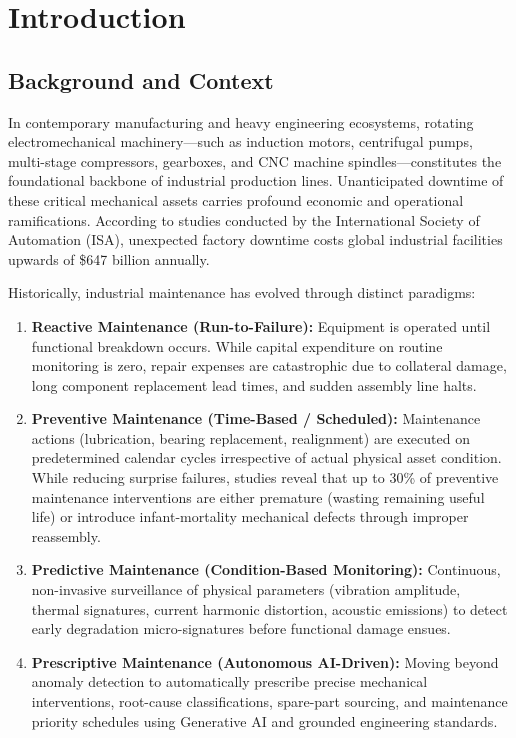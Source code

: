 \documentclass[12pt,a4paper,oneside]{report}
\begin{document}
\chapter{Introduction}

\section{Background and Context}
In contemporary manufacturing and heavy engineering ecosystems, rotating electromechanical machinery—such as induction motors, centrifugal pumps, multi-stage compressors, gearboxes, and CNC machine spindles—constitutes the foundational backbone of industrial production lines. Unanticipated downtime of these critical mechanical assets carries profound economic and operational ramifications. According to studies conducted by the International Society of Automation (ISA), unexpected factory downtime costs global industrial facilities upwards of \$647 billion annually. 

Historically, industrial maintenance has evolved through distinct paradigms:
\begin{enumerate}[label=\textbf{\arabic*.}]
    \item \textbf{Reactive Maintenance (Run-to-Failure):} Equipment is operated until functional breakdown occurs. While capital expenditure on routine monitoring is zero, repair expenses are catastrophic due to collateral damage, long component replacement lead times, and sudden assembly line halts.
    \item \textbf{Preventive Maintenance (Time-Based / Scheduled):} Maintenance actions (lubrication, bearing replacement, realignment) are executed on predetermined calendar cycles irrespective of actual physical asset condition. While reducing surprise failures, studies reveal that up to 30\% of preventive maintenance interventions are either premature (wasting remaining useful life) or introduce infant-mortality mechanical defects through improper reassembly.
    \item \textbf{Predictive Maintenance (Condition-Based Monitoring):} Continuous, non-invasive surveillance of physical parameters (vibration amplitude, thermal signatures, current harmonic distortion, acoustic emissions) to detect early degradation micro-signatures before functional damage ensues.
    \item \textbf{Prescriptive Maintenance (Autonomous AI-Driven):} Moving beyond anomaly detection to automatically prescribe precise mechanical interventions, root-cause classifications, spare-part sourcing, and maintenance priority schedules using Generative AI and grounded engineering standards.
\end{enumerate}
\end{document}
